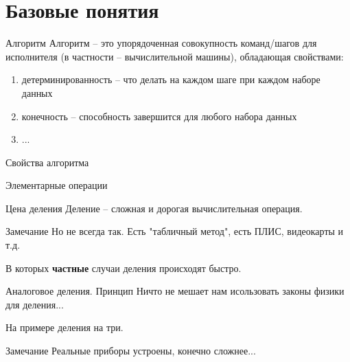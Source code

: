 \section{Базовые понятия}\label{section:base_alg}

\begin{frame}{Алгоритм}
Алгоритм -- это упорядоченная совокупность команд/шагов
для исполнителя (в частности -- вычислительной машины),
обладающая свойствами:
\begin{enumerate}
	\item детерминированность -- что делать на каждом шаге при каждом наборе данных
	\item конечность -- способность завершится для любого набора данных
	\item ... %
\end{enumerate}
 
Свойства алгоритма	
\end{frame}

\begin{frame}{Элементарные операции}
	
\end{frame}

\begin{frame}{Цена деления}
Деление -- сложная и дорогая вычислительная операция.
	
	\begin{block}{Замечание}
	Но не всегда так. 
	Есть "табличный метод",
	есть ПЛИС, видеокарты и т.д.
	
	В которых \textbf{частные} случаи деления происходят быстро.
	\end{block}

\end{frame}

\begin{frame}{Аналоговое деления. Принцип}
 	Ничто не мешает нам исользовать законы физики для деления...
 	
 	На примере деления на три.
 	
 	
	
	\begin{block}{Замечание}
	Реальные приборы устроены, конечно сложнее...
	\end{block}


\end{frame}





